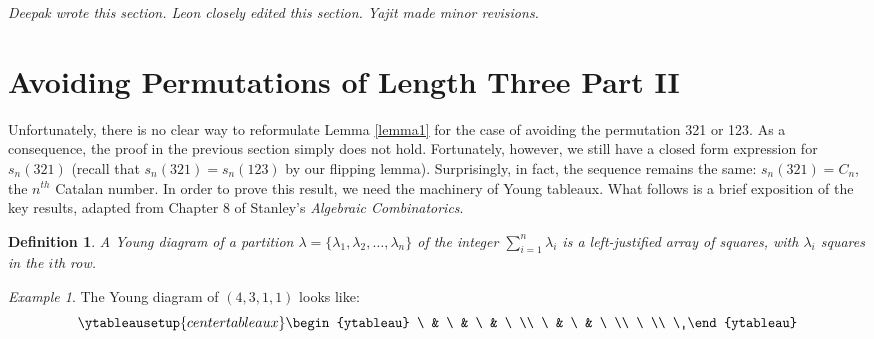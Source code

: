 \documentclass[11pt,letterpaper,twoside,english]{article}
\theoremstyle{theorem}
\newtheorem{definition}[theorem]{Definition}
\theoremstyle{remark}
\newtheorem{example}[theorem]{Example}
\begin{document}
\emph{Deepak wrote this section. Leon closely edited this section. Yajit made minor revisions.}


\section{Avoiding Permutations of Length Three Part II}

\label{321}
Unfortunately, there is no clear way to reformulate Lemma \ref{lemma1} for the case of avoiding the permutation 321 or 123. As a consequence, the proof in the previous section simply does not hold. Fortunately, however, we still have a closed form expression for $s_n(321)$ (recall that $s_n(321)=s_n(123)$ by our flipping lemma). Surprisingly, in fact, the sequence remains the same: $s_n(321)=C_n$, the $n^{th}$ Catalan number. In order to prove this result, we need the machinery of Young tableaux. What follows is a brief exposition of the key results, adapted from Chapter 8 of Stanley's \emph{Algebraic Combinatorics}.

\begin{definition}
A Young diagram of a partition $\lambda=\{\lambda_1, \lambda_2, \ldots, \lambda_n\}$ of the integer $\sum_{i=1}^n \lambda_i$ is a left-justified array of squares, with $\lambda_i$ squares in the $i$th row.
\end{definition}
\begin{example}
The Young diagram of $(4, 3, 1, 1)$ looks like:
\[
\ytableausetup{centertableaux}
\begin{ytableau}
\ & \ & \ & \ \\
\ & \ & \ \\
\ \\
\
\end{ytableau}
\]
\end{example}
\end{document}
